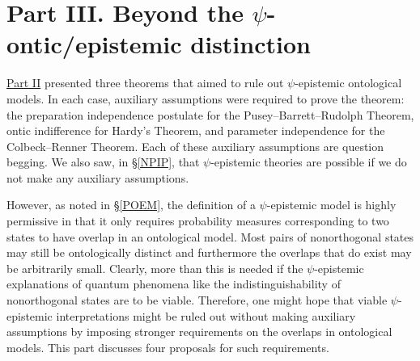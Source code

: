 \documentclass[DIV=calc,paper=a4,fontsize=11pt,twocolumn]{scrartcl} %
\theoremstyle{definition}
\theoremstyle{plain}
\begin{document}
\section*{Part III. Beyond the $\psi$-ontic/epistemic distinction\label{Beyond}}

\hyperref[SPON]{Part II} presented three theorems that aimed to rule out
$\psi$-epistemic ontological models.  In each case, auxiliary
assumptions were required to prove the theorem: the preparation
independence postulate for the Pusey--Barrett--Rudolph Theorem, ontic indifference for
Hardy's Theorem, and parameter independence for the Colbeck--Renner
Theorem.  Each of these auxiliary assumptions are question begging.
We also saw, in \S\ref{NPIP}, that $\psi$-epistemic theories are
possible if we do not make any auxiliary assumptions.

However, as noted in \S\ref{POEM}, the definition of a
$\psi$-epistemic model is highly permissive in that it only requires
probability measures corresponding to two states to have overlap in an
ontological model.  Most pairs of nonorthogonal states may still be
ontologically distinct and furthermore the overlaps that do exist may
be arbitrarily small.  Clearly, more than this is needed if the
$\psi$-epistemic explanations of quantum phenomena like the
indistinguishability of nonorthogonal states are to be viable.
Therefore, one might hope that viable $\psi$-epistemic interpretations
might be ruled out without making auxiliary assumptions by imposing
stronger requirements on the overlaps in ontological models.  This
part discusses four proposals for such requirements.
\end{document}
